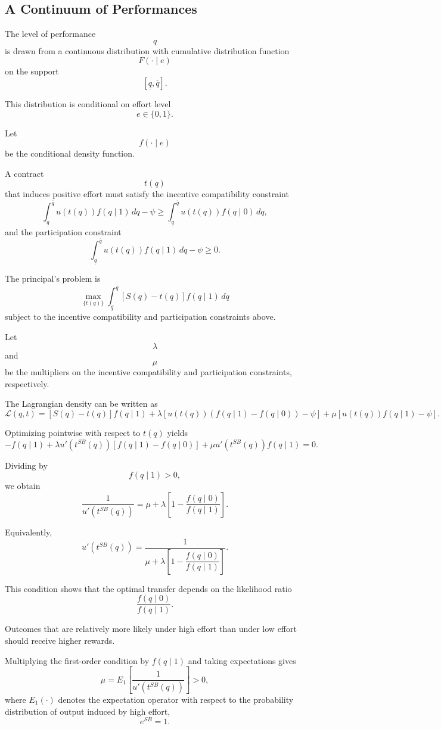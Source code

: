 \subsection{A Continuum of Performances}

The level of performance
\[
q
\]
is drawn from a continuous distribution with cumulative distribution function
\[
F(\cdot\mid e)
\]
on the support
\[
[\underline q,\overline q].
\]

This distribution is conditional on effort level
\[
e\in\{0,1\}.
\]

Let
\[
f(\cdot\mid e)
\]
be the conditional density function.

A contract
\[
t(q)
\]
that induces positive effort must satisfy the incentive compatibility constraint
\[
\int_{\underline q}^{\overline q}
u(t(q))f(q\mid 1)\,dq
-
\psi
\ge
\int_{\underline q}^{\overline q}
u(t(q))f(q\mid 0)\,dq,
\]
and the participation constraint
\[
\int_{\underline q}^{\overline q}
u(t(q))f(q\mid 1)\,dq
-
\psi
\ge 0.
\]

The principal's problem is
\[
\max_{\{t(q)\}}
\int_{\underline q}^{\overline q}
\left[
S(q)-t(q)
\right]
f(q\mid 1)\,dq
\]
subject to the incentive compatibility and participation constraints above.

Let
\[
\lambda
\]
and
\[
\mu
\]
be the multipliers on the incentive compatibility and participation constraints, respectively.

The Lagrangian density can be written as
\[
\mathcal{L}(q,t)
=
[S(q)-t(q)]f(q\mid 1)
+
\lambda
\left[
u(t(q))(f(q\mid 1)-f(q\mid 0))
-\psi
\right]
+
\mu
\left[
u(t(q))f(q\mid 1)
-\psi
\right].
\]

Optimizing pointwise with respect to \(t(q)\) yields
\[
-f(q\mid 1)
+
\lambda u'(t^{SB}(q))
\left[
f(q\mid 1)-f(q\mid 0)
\right]
+
\mu u'(t^{SB}(q))f(q\mid 1)
=
0.
\]

Dividing by
\[
f(q\mid 1)>0,
\]
we obtain
\[
\frac{1}{u'(t^{SB}(q))}
=
\mu
+
\lambda
\left[
1-
\frac{f(q\mid 0)}{f(q\mid 1)}
\right].
\]

Equivalently,
\[
u'(t^{SB}(q))
=
\frac{1}{
\mu
+
\lambda
\left[
1-
\dfrac{f(q\mid 0)}{f(q\mid 1)}
\right]
}.
\]

This condition shows that the optimal transfer depends on the likelihood ratio
\[
\frac{f(q\mid 0)}{f(q\mid 1)}.
\]

Outcomes that are relatively more likely under high effort than under low effort should receive higher rewards.



Multiplying the first-order condition by \(f(q\mid 1)\) and taking expectations gives
\[
\mu
=
E_1\left[
\frac{1}{u'(t^{SB}(q))}
\right]
>0,
\]
where \(E_1(\cdot)\) denotes the expectation operator with respect to the probability distribution of output induced by high effort,
\[
e^{SB}=1.
\]

